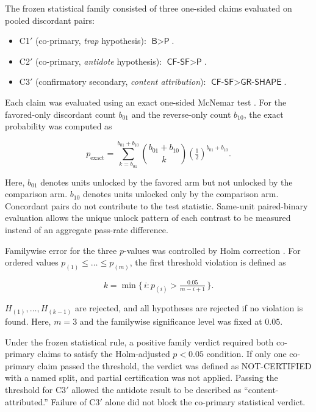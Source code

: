 \documentclass{article}
\numberwithin{equation}{section}  %
\theoremstyle{definition}
\newcommand{\bten}{b_{10}}
\newcommand{\bzo}{b_{01}}
\newcommand{\armP}{\textsf{P}}
\newcommand{\armB}{\textsf{B}}
\newcommand{\armCF}{\textsf{CF-SF}}
\newcommand{\armGR}{\textsf{GR-SHAPE}}
\newcommand{\Cone}{C1$'$}
\newcommand{\Ctwo}{C2$'$}
\newcommand{\Cthree}{C3$'$}
\begin{document}
The frozen statistical family consisted of three one-sided claims evaluated on pooled
discordant pairs:

\begin{itemize}[leftmargin=2em]
  \item \Cone{} (co-primary, \emph{trap} hypothesis): $\armB>\armP$.
  \item \Ctwo{} (co-primary, \emph{antidote} hypothesis): $\armCF>\armP$.
  \item \Cthree{} (confirmatory secondary, \emph{content attribution}):
        $\armCF>\armGR$.
\end{itemize}

Each claim was evaluated using an exact one-sided McNemar test
\citep{mcnemar1947note,fagerland2013mcnemar}. For the favored-only discordant count $\bzo$
and the reverse-only count $\bten$, the exact probability was computed as

\begin{equation}\label{eq:mcnemar}
p_{\mathrm{exact}}=
\sum_{k=\bzo}^{\bzo+\bten}
\binom{\bzo+\bten}{k}
\left(\tfrac{1}{2}\right)^{\bzo+\bten}.
\end{equation}

Here, $\bzo$ denotes units unlocked by the favored arm but not unlocked by the comparison arm.
$\bten$ denotes units unlocked only by the comparison arm. Concordant pairs do not contribute
to the test statistic. Same-unit paired-binary evaluation allows the unique unlock pattern of
each contrast to be measured instead of an aggregate pass-rate difference.

Familywise error for the three $p$-values was controlled by Holm correction
\citep{holm1979simple}. For ordered values $p_{(1)}\le\dots\le p_{(m)}$, the first threshold
violation is defined as

\begin{equation}\label{eq:holm}
k=\min\Big\{\,i:
p_{(i)}>\tfrac{0.05}{m-i+1}\,\Big\}.
\end{equation}

$H_{(1)},\dots,H_{(k-1)}$ are rejected, and all hypotheses are rejected if no violation is
found. Here, $m=3$ and the familywise significance level was fixed at $0.05$.

Under the frozen statistical rule, a positive family verdict required both co-primary claims
to satisfy the Holm-adjusted $p<0.05$ condition. If only one co-primary claim passed the
threshold, the verdict was defined as NOT-CERTIFIED with a named split, and partial
certification was not applied. Passing the threshold for \Cthree{} allowed the antidote result
to be described as ``content-attributed.'' Failure of \Cthree{} alone did not block the
co-primary statistical verdict.
\end{document}
